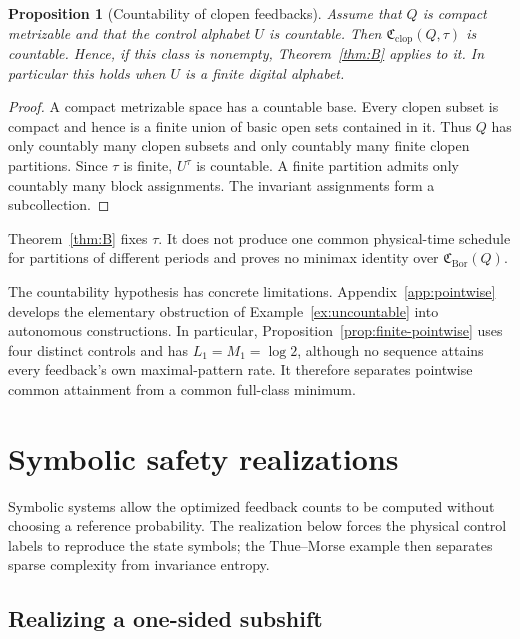 \documentclass[11pt,reqno]{amsart}
\numberwithin{equation}{section}
\newtheorem{proposition}[theorem]{Proposition}
\theoremstyle{definition}
\newcommand{\Bor}{\mathrm{Bor}}
\newcommand{\clop}{\mathrm{clop}}
\begin{document}
\begin{proposition}[Countability of clopen feedbacks]
\label{prop:digital}
Assume that $Q$ is compact metrizable and that the control alphabet $U$ is
countable.  Then
$\mathfrak C_{\clop}(Q,\tau)$ is countable.  Hence, if this class is nonempty,
Theorem~\ref{thm:B} applies to it.  In particular this holds when $U$ is a
finite digital alphabet.
\end{proposition}

\begin{proof}
A compact metrizable space has a countable base.  Every clopen subset is
compact and hence is a finite union of basic open sets contained in it.  Thus
$Q$ has only countably many clopen subsets and only countably many finite
clopen partitions.  Since $\tau$ is finite, $U^\tau$ is countable.  A finite
partition admits only countably many block assignments.  The invariant assignments form a
subcollection.
\end{proof}

Theorem~\ref{thm:B} fixes $\tau$.  It does not produce one common
physical-time schedule for partitions of different periods and proves no
minimax identity over $\mathfrak C_{\Bor}(Q)$.



The countability hypothesis has concrete limitations.
Appendix~\ref{app:pointwise} develops the elementary obstruction
of Example~\ref{ex:uncountable} into autonomous constructions.
In particular, Proposition~\ref{prop:finite-pointwise}
uses four distinct controls and has $L_1=M_1=\log2$, although no
sequence attains every feedback's own maximal-pattern rate. It therefore
separates pointwise common attainment from a common full-class minimum.


\section{Symbolic safety realizations}\label{sec:realization}

Symbolic systems allow the optimized feedback counts to be computed
without choosing a reference probability. The realization below
forces the physical control labels to reproduce the state symbols;
the Thue--Morse example then separates sparse complexity from
invariance entropy.

\subsection{Realizing a one-sided subshift}
\end{document}
